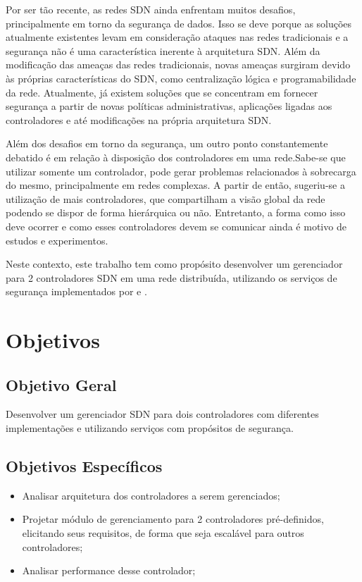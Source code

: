 \par Por ser tão recente, as redes SDN ainda enfrentam muitos desafios, principalmente em torno da segurança de dados. Isso se deve porque as soluções atualmente existentes levam em consideração ataques nas redes tradicionais e a segurança não é uma característica inerente à arquitetura SDN. Além da modificação das ameaças das redes tradicionais, novas ameaças surgiram devido às próprias características do SDN, como centralização lógica e programabilidade da rede. Atualmente, já existem soluções que se concentram em fornecer segurança a partir de novas políticas administrativas, aplicações ligadas aos controladores e até modificações na própria arquitetura SDN.
\par Além dos desafios em torno da segurança, um outro ponto constantemente debatido é em relação à disposição dos controladores em uma rede.Sabe-se que utilizar somente um controlador, pode gerar problemas relacionados à sobrecarga do mesmo, principalmente em redes complexas. A partir de então, sugeriu-se a utilização de mais controladores, que compartilham a visão global da rede podendo se dispor de forma hierárquica ou não. Entretanto, a forma como isso deve ocorrer e como esses controladores devem se comunicar ainda é motivo de estudos e experimentos.
\par Neste contexto, este trabalho tem como propósito desenvolver um gerenciador para 2 controladores SDN em uma rede distribuída, utilizando os serviços de segurança implementados por  e .  

\section{Objetivos}

\subsection{Objetivo Geral}

Desenvolver um gerenciador SDN para dois controladores com diferentes implementações e utilizando serviços com propósitos de segurança.

\subsection{Objetivos Específicos}

\begin{itemize}
    \item Analisar arquitetura dos controladores a serem gerenciados;
    \item Projetar módulo de gerenciamento para 2 controladores pré-definidos, elicitando seus requisitos, de forma que seja escalável para outros controladores;
    \item Analisar performance desse controlador;
\end{itemize}


